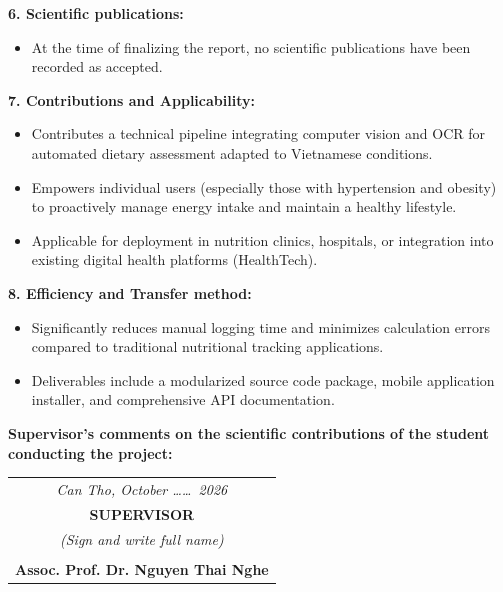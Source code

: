 \vspace{0.3cm}
\noindent\textbf{6. Scientific publications:}
\begin{itemize}[leftmargin=0.8cm, label=\textbullet, itemsep=2pt, topsep=2pt]
    \item[] At the time of finalizing the report, no scientific publications have been recorded as accepted.
\end{itemize}

\vspace{0.3cm}
\noindent\textbf{7. Contributions and Applicability:}
\begin{itemize}[leftmargin=0.8cm, label=\textbullet, itemsep=2pt, topsep=2pt]
    \item Contributes a technical pipeline integrating computer vision and OCR for automated dietary assessment adapted to Vietnamese conditions.
    \item Empowers individual users (especially those with hypertension and obesity) to proactively manage energy intake and maintain a healthy lifestyle.
    \item Applicable for deployment in nutrition clinics, hospitals, or integration into existing digital health platforms (HealthTech).
\end{itemize}

\vspace{0.3cm}
\noindent\textbf{8. Efficiency and Transfer method:}
\begin{itemize}[leftmargin=0.8cm, label=\textbullet, itemsep=2pt, topsep=2pt]
    \item Significantly reduces manual logging time and minimizes calculation errors compared to traditional nutritional tracking applications.
    \item Deliverables include a modularized source code package, mobile application installer, and comprehensive API documentation.
\end{itemize}

\vspace{0.6cm}
\noindent\textbf{Supervisor's comments on the scientific contributions of the student conducting the project:}\par
\vspace{0.2cm}
\noindent\dotfill\par
\vspace{0.1cm}
\noindent\dotfill\par
\vspace{0.1cm}
\noindent\dotfill\par
\vspace{0.1cm}
\noindent\dotfill\par

\vspace{0.8cm}
\hfill
\begin{tabular}{c}
    \textit{Can Tho, October \dots\dots\ 2026} \\
    \textbf{SUPERVISOR} \\
    \textit{(Sign and write full name)} \\
    \vspace{2.0cm} \\
    \textbf{Assoc. Prof. Dr. Nguyen Thai Nghe}
\end{tabular}